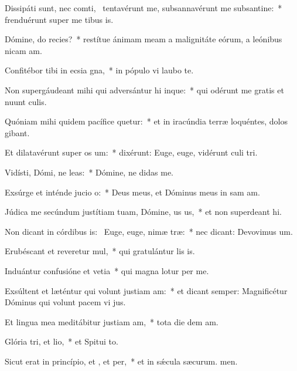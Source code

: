\item Dissipáti sunt, nec comti,~\pscross{} tentavérunt me, subsannavérunt me subsantine:~* frenduérunt super me tibus is.
\item Dómine, do recies?~* restítue ánimam meam a malignitáte eórum, a leónibus nicam am.
\item Confitébor tibi in ecsia gna,~* in pópulo vi laubo te.
\item Non supergáudeant mihi qui adversántur hi inque:~* qui odérunt me gratis et nuunt culis.
\item Quóniam mihi quidem pacífice quetur:~* et in iracúndia terræ loquéntes, dolos gibant.
\item Et dilatavérunt super  os um:~* dixérunt: Euge, euge, vidérunt culi tri.
\item Vidísti, Dómi, ne leas:~* Dómine, ne didas  me.
\item Exsúrge et inténde jucio o:~* Deus meus, et Dóminus meus in sam am.
\item Júdica me secúndum justítiam tuam, Dómine, us us,~* et non superdeant hi.
\item Non dicant in córdibus is:~\pscross{} Euge, euge, nimæ træ:~* nec dicant: Devovimus um.
\item Erubéscant et reveretur mul,~* qui gratulántur lis is.
\item Induántur confusióne et vetia~* qui magna lotur per me.
\item Exsúltent et læténtur qui volunt justiam am:~* et dicant semper: Magnificétur Dóminus qui volunt pacem vi jus.
\item Et lingua mea meditábitur justiam am,~* tota die dem am.
\item Glória tri, et lio,~* et Spitui to.
\item Sicut erat in princípio, et , et per,~* et in sǽcula sæcurum. men.

